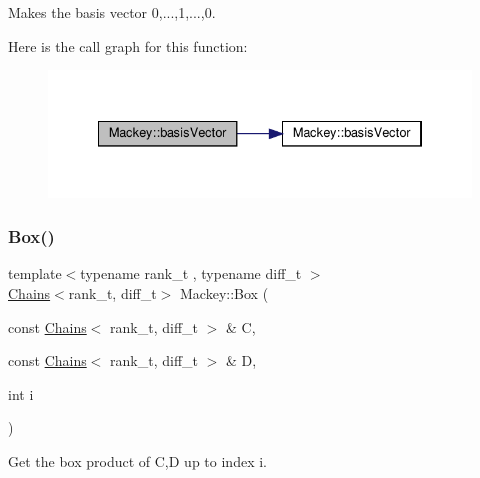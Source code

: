 Makes the basis vector 0,...,1,...,0. 

Here is the call graph for this function\+:\nopagebreak
\begin{figure}[H]
\begin{center}
\leavevmode
\includegraphics[width=334pt]{namespaceMackey_ae3454eb9b2574a835a29e3f58cfc6ead_cgraph}
\end{center}
\end{figure}
\mbox{\label{namespaceMackey_add5b60c8e734df2be261106e0c719f82}} 
\subsubsection{\texorpdfstring{Box()}{Box()}\hspace{0.1cm}{\footnotesize\ttfamily [1/2]}}
{\footnotesize\ttfamily template$<$typename rank\+\_\+t , typename diff\+\_\+t $>$ \\
\hyperlink{classMackey_1_1Chains}{Chains}$<$rank\+\_\+t, diff\+\_\+t$>$ Mackey\+::\+Box (\begin{DoxyParamCaption}\item[{const \hyperlink{classMackey_1_1Chains}{Chains}$<$ rank\+\_\+t, diff\+\_\+t $>$ \&}]{C,  }\item[{const \hyperlink{classMackey_1_1Chains}{Chains}$<$ rank\+\_\+t, diff\+\_\+t $>$ \&}]{D,  }\item[{int}]{i }\end{DoxyParamCaption})\hspace{0.3cm}{\ttfamily [inline]}}



Get the box product of C,D up to index i. 

\mbox{\label{namespaceMackey_a72abbe3708c4e77936c8cc42fbc6753a}} 
